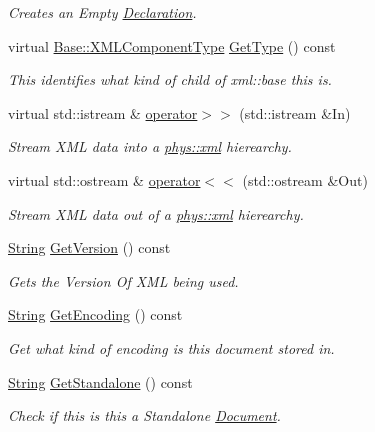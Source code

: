 \begin{DoxyCompactItemize}
\begin{DoxyCompactList}\small\item\em Creates an Empty \hyperlink{classphys_1_1xml_1_1Declaration}{Declaration}. \item\end{DoxyCompactList}\item 
virtual \hyperlink{classphys_1_1xml_1_1Base_a62ba0484b5ecb502f9ae9d82d3720320}{Base::XMLComponentType} \hyperlink{classphys_1_1xml_1_1Declaration_a890781a20779f26dabecfa777907b8c3}{GetType} () const 
\begin{DoxyCompactList}\small\item\em This identifies what kind of child of xml::base this is. \item\end{DoxyCompactList}\item 
virtual std::istream \& \hyperlink{classphys_1_1xml_1_1Declaration_a00acf3281c9765d514b1a9afbfd79688}{operator$>$$>$} (std::istream \&In)
\begin{DoxyCompactList}\small\item\em Stream XML data into a \hyperlink{namespacephys_1_1xml}{phys::xml} hierearchy. \item\end{DoxyCompactList}\item 
virtual std::ostream \& \hyperlink{classphys_1_1xml_1_1Declaration_ae57b8d5ac09e41810740cfaf72278fa2}{operator$<$$<$} (std::ostream \&Out)
\begin{DoxyCompactList}\small\item\em Stream XML data out of a \hyperlink{namespacephys_1_1xml}{phys::xml} hierearchy. \item\end{DoxyCompactList}\item 
\hyperlink{namespacephys_aa03900411993de7fbfec4789bc1d392e}{String} \hyperlink{classphys_1_1xml_1_1Declaration_a9a176d4f92d1278f849211911be290ed}{GetVersion} () const 
\begin{DoxyCompactList}\small\item\em Gets the Version Of XML being used. \item\end{DoxyCompactList}\item 
\hyperlink{namespacephys_aa03900411993de7fbfec4789bc1d392e}{String} \hyperlink{classphys_1_1xml_1_1Declaration_aa42a5baf535812505d3940a4a12a9629}{GetEncoding} () const 
\begin{DoxyCompactList}\small\item\em Get what kind of encoding is this document stored in. \item\end{DoxyCompactList}\item 
\hyperlink{namespacephys_aa03900411993de7fbfec4789bc1d392e}{String} \hyperlink{classphys_1_1xml_1_1Declaration_a32f767a5ae92a47b5a49fa59f8ed1a18}{GetStandalone} () const 
\begin{DoxyCompactList}\small\item\em Check if this is this a Standalone \hyperlink{classphys_1_1xml_1_1Document}{Document}. \item\end{DoxyCompactList}\end{DoxyCompactItemize}
